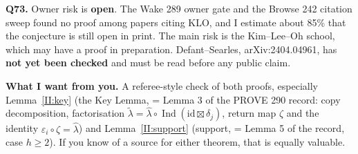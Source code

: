 \documentclass[11pt]{amsart}
\newcommand{\Ind}{\operatorname{Ind}}
\newcommand{\sq}{\boxtimes}
\theoremstyle{plain}
\theoremstyle{definition}
\begin{document}
\noindent\textbf{Q73.} Owner risk is \textbf{open}. The Wake 289 owner gate and the Browse 242 citation sweep found no proof among papers citing KLO, and I estimate about 85\% that the conjecture is still open in print. The main risk is the Kim--Lee--Oh school, which may have a proof in preparation. Defant--Searles, arXiv:2404.04961, has \textbf{not yet been checked} and must be read before any public claim.

\noindent\textbf{What I want from you.} A referee-style check of both proofs, especially Lemma~\ref{II:key} (the Key Lemma, = Lemma 3 of the PROVE 290 record: copy decomposition, factorisation $\widetilde\lambda=\widehat\lambda\circ\Ind(\mathrm{id}\sq\delta_j)$, return map $\zeta$ and the identity $\varepsilon_i\circ\zeta=\widehat\lambda$) and Lemma~\ref{II:support} (support, = Lemma 5 of the record, case $h\ge2$). If you know of a source for either theorem, that is equally valuable.
\end{document}
